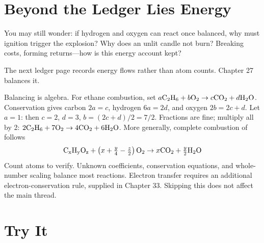 \section{Beyond the Ledger Lies Energy}

You may still wonder: if hydrogen and oxygen can react once balanced, why must ignition trigger the explosion? Why does an unlit candle not burn? Breaking costs, forming returns---how is this energy account kept?

The next ledger page records energy flows rather than atom counts. Chapter 27 balances it.

\begin{tiaozhan}
Balancing is algebra. For ethane combustion, set $a\mathrm{C_2H_6} + b\mathrm{O_2} \rightarrow c\mathrm{CO_2} + d\mathrm{H_2O}$. Conservation gives carbon $2a=c$, hydrogen $6a=2d$, and oxygen $2b=2c+d$. Let $a=1$: then $c=2$, $d=3$, $b=(2c+d)/2=7/2$. Fractions are fine; multiply all by 2: $\mathrm{2C_2H_6} + \mathrm{7O_2} \rightarrow \mathrm{4CO_2} + \mathrm{6H_2O}$. More generally, complete combustion of  follows
\[\mathrm{C_xH_yO_z} + \left(x+\tfrac{y}{4}-\tfrac{z}{2}\right)\mathrm{O_2} \rightarrow x\mathrm{CO_2} + \tfrac{y}{2}\mathrm{H_2O}\]
Count atoms to verify. Unknown coefficients, conservation equations, and whole-number scaling balance most reactions. Electron transfer requires an additional electron-conservation rule, supplied in Chapter 33. Skipping this does not affect the main thread.
\end{tiaozhan}

\section*{Try It}

